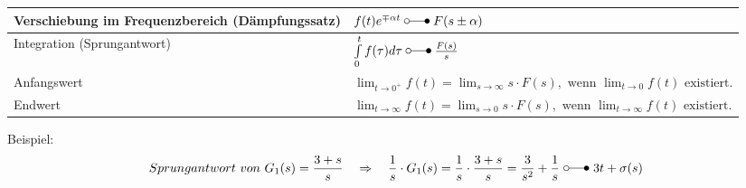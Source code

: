 \begin{tabular}{|l|l|}
  					\hline
  		 			Verschiebung im Frequenzbereich (Dämpfungssatz) &
  		 			$f(t)e^{\mp\alpha t} \; \laplace \; F(s\pm\alpha)$ \\
  		 			\hline
  		 			Integration (Sprungantwort)&
  		 			$\int\limits_0^t f(\tau)d\tau \; \laplace \; \frac{F(s)}{s}$ \\
  		 			\hline
  		 			Anfangswert &
  		 			$\lim_{t\rightarrow 0^+} f(t) = \lim_{s\rightarrow \infty} s\cdot F(s),\text{~wenn
  		 			}  \lim_{t\rightarrow 0} f(t)\text{~existiert}.$ \\
  		 			\hline
  		 			Endwert &
  		 			$\lim_{t\rightarrow \infty} f(t) = \lim_{s\rightarrow 0} s\cdot F(s),\text{~wenn
  		 			}  \lim_{t\rightarrow \infty} f(t)\text{~existiert}.$ \\
  		 			\hline
  		       	\end{tabular}
  				
Beispiel: \[Sprungantwort \ von \ G_1(s) = \frac{3+s}{s} \quad \Rightarrow \quad \frac{1}{s}\cdot G_1(s)= \frac{1}{s}\cdot\frac{3+s}{s}=\frac{3}{s^2}+\frac{1}{s} \ \laplace \ 3t +\sigma(s)\]
\newpage
